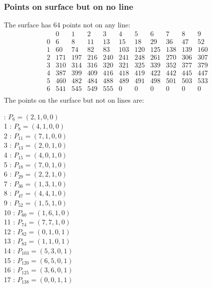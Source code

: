 \documentclass{article}
\begin{document}
{\subsubsection*{Points on surface but on no line}
The surface has 64 points not on any line:\\
$$
\begin{array}{r|*{10}{r}}
 & 0 & 1 & 2 & 3 & 4 & 5 & 6 & 7 & 8 & 9\\
\hline
0 & 6 & 8 & 11 & 13 & 15 & 18 & 29 & 36 & 47 & 52\\
1 & 60 & 74 & 82 & 83 & 103 & 120 & 125 & 138 & 139 & 160\\
2 & 171 & 197 & 216 & 240 & 241 & 248 & 261 & 270 & 306 & 307\\
3 & 310 & 314 & 316 & 320 & 321 & 325 & 339 & 352 & 377 & 379\\
4 & 387 & 399 & 409 & 416 & 418 & 419 & 422 & 442 & 445 & 447\\
5 & 460 & 482 & 484 & 488 & 489 & 491 & 498 & 501 & 503 & 533\\
6 & 541 & 545 & 549 & 555 & 0 & 0 & 0 & 0 & 0 & 0\\
\end{array}
$$
The points on the surface but not on lines are:\\
\begin{multicols}{2}
 : $P_{6}=( 2, 1, 0, 0 )$\\
1 : $P_{8}=( 4, 1, 0, 0 )$\\
2 : $P_{11}=( 7, 1, 0, 0 )$\\
3 : $P_{13}=( 2, 0, 1, 0 )$\\
4 : $P_{15}=( 4, 0, 1, 0 )$\\
5 : $P_{18}=( 7, 0, 1, 0 )$\\
6 : $P_{29}=( 2, 2, 1, 0 )$\\
7 : $P_{36}=( 1, 3, 1, 0 )$\\
8 : $P_{47}=( 4, 4, 1, 0 )$\\
9 : $P_{52}=( 1, 5, 1, 0 )$\\
10 : $P_{60}=( 1, 6, 1, 0 )$\\
11 : $P_{74}=( 7, 7, 1, 0 )$\\
12 : $P_{82}=( 0, 1, 0, 1 )$\\
13 : $P_{83}=( 1, 1, 0, 1 )$\\
14 : $P_{103}=( 5, 3, 0, 1 )$\\
15 : $P_{120}=( 6, 5, 0, 1 )$\\
16 : $P_{125}=( 3, 6, 0, 1 )$\\
17 : $P_{138}=( 0, 0, 1, 1 )$\\

\end{multicols}}
\end{document}
